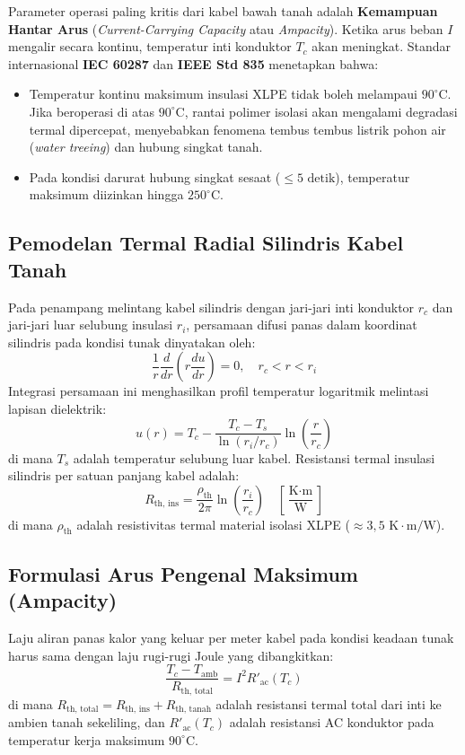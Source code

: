 \documentclass[11pt,a4paper]{article}
\theoremstyle{definition}
\begin{document}
Parameter operasi paling kritis dari kabel bawah tanah adalah \textbf{Kemampuan Hantar Arus} (\textit{Current-Carrying Capacity} atau \textit{Ampacity}). Ketika arus beban $I$ mengalir secara kontinu, temperatur inti konduktor $T_c$ akan meningkat. Standar internasional \textbf{IEC 60287} dan \textbf{IEEE Std 835} menetapkan bahwa:
\begin{itemize}[leftmargin=*]
    \item Temperatur kontinu maksimum insulasi XLPE tidak boleh melampaui \textbf{$90^\circ\text{C}$}. Jika beroperasi di atas $90^\circ\text{C}$, rantai polimer isolasi akan mengalami degradasi termal dipercepat, menyebabkan fenomena tembus tembus listrik pohon air (\textit{water treeing}) dan hubung singkat tanah.
    \item Pada kondisi darurat hubung singkat sesaat ($\le 5\text{ detik}$), temperatur maksimum diizinkan hingga \textbf{$250^\circ\text{C}$}.
\end{itemize}

\subsection{Pemodelan Termal Radial Silindris Kabel Tanah}
Pada penampang melintang kabel silindris dengan jari-jari inti konduktor $r_c$ dan jari-jari luar selubung insulasi $r_i$, persamaan difusi panas dalam koordinat silindris pada kondisi tunak dinyatakan oleh:
\begin{equation}
    \frac{1}{r} \frac{d}{dr} \left( r \frac{du}{dr} \right) = 0, \quad r_c < r < r_i
\end{equation}
Integrasi persamaan ini menghasilkan profil temperatur logaritmik melintasi lapisan dielektrik:
\begin{equation}
    u(r) = T_c - \frac{T_c - T_s}{\ln(r_i / r_c)} \ln\left(\frac{r}{r_c}\right)
\end{equation}
di mana $T_s$ adalah temperatur selubung luar kabel. Resistansi termal insulasi silindris per satuan panjang kabel adalah:
\begin{equation}
    R_{\text{th, ins}} = \frac{\rho_{\text{th}}}{2\pi} \ln\left(\frac{r_i}{r_c}\right)\quad \left[\frac{\text{K}\cdot\text{m}}{\text{W}}\right]
    \label{eq:thermal_res_ins}
\end{equation}
di mana $\rho_{\text{th}}$ adalah resistivitas termal material isolasi XLPE ($\approx 3{,}5\text{ K}\cdot\text{m}/\text{W}$).

\subsection{Formulasi Arus Pengenal Maksimum (Ampacity)}
Laju aliran panas kalor yang keluar per meter kabel pada kondisi keadaan tunak harus sama dengan laju rugi-rugi Joule yang dibangkitkan:
\begin{equation}
    \frac{T_c - T_{\text{amb}}}{R_{\text{th, total}}} = I^2 R'_{\text{ac}}(T_c)
\end{equation}
di mana $R_{\text{th, total}} = R_{\text{th, ins}} + R_{\text{th, tanah}}$ adalah resistansi termal total dari inti ke ambien tanah sekeliling, dan $R'_{\text{ac}}(T_c)$ adalah resistansi AC konduktor pada temperatur kerja maksimum $90^\circ\text{C}$.
\end{document}
